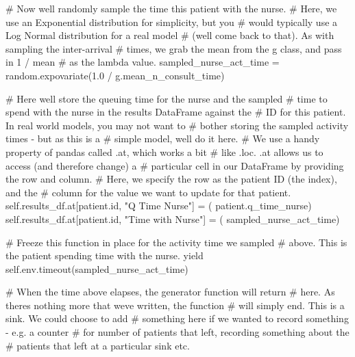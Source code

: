\documentclass[
  letterpaper,
  DIV=11,
  numbers=noendperiod]{scrreprt}
\newenvironment{Shaded}{}{}
\newcommand{\BuiltInTok}[1]{\textcolor[rgb]{0.84,0.23,0.29}{#1}}
\newcommand{\CommentTok}[1]{\textcolor[rgb]{0.42,0.45,0.49}{#1}}
\newcommand{\ControlFlowTok}[1]{\textcolor[rgb]{0.84,0.23,0.29}{#1}}
\newcommand{\FloatTok}[1]{\textcolor[rgb]{0.00,0.36,0.77}{#1}}
\newcommand{\NormalTok}[1]{\textcolor[rgb]{0.14,0.16,0.18}{#1}}
\newcommand{\OperatorTok}[1]{\textcolor[rgb]{0.14,0.16,0.18}{#1}}
\newcommand{\StringTok}[1]{\textcolor[rgb]{0.01,0.18,0.38}{#1}}
\newcommand{\VariableTok}[1]{\textcolor[rgb]{0.89,0.38,0.04}{#1}}
\begin{document}
\begin{tcolorbox}
\begin{Shaded}
\begin{Highlighting}[]
            \CommentTok{\# Now we\textquotesingle{}ll randomly sample the time this patient with the nurse.}
            \CommentTok{\# Here, we use an Exponential distribution for simplicity, but you}
            \CommentTok{\# would typically use a Log Normal distribution for a real model}
            \CommentTok{\# (we\textquotesingle{}ll come back to that).  As with sampling the inter{-}arrival}
            \CommentTok{\# times, we grab the mean from the g class, and pass in 1 / mean}
            \CommentTok{\# as the lambda value.}
\NormalTok{            sampled\_nurse\_act\_time }\OperatorTok{=}\NormalTok{ random.expovariate(}\FloatTok{1.0} \OperatorTok{/}
\NormalTok{                                                        g.mean\_n\_consult\_time)}

            \CommentTok{\# Here we\textquotesingle{}ll store the queuing time for the nurse and the sampled}
            \CommentTok{\# time to spend with the nurse in the results DataFrame against the}
            \CommentTok{\# ID for this patient.  In real world models, you may not want to}
            \CommentTok{\# bother storing the sampled activity times {-} but as this is a}
            \CommentTok{\# simple model, we\textquotesingle{}ll do it here.}
            \CommentTok{\# We use a handy property of pandas called .at, which works a bit}
            \CommentTok{\# like .loc.  .at allows us to access (and therefore change) a}
            \CommentTok{\# particular cell in our DataFrame by providing the row and column.}
            \CommentTok{\# Here, we specify the row as the patient ID (the index), and the}
            \CommentTok{\# column for the value we want to update for that patient.}
            \VariableTok{self}\NormalTok{.results\_df.at[patient.}\BuiltInTok{id}\NormalTok{, }\StringTok{"Q Time Nurse"}\NormalTok{] }\OperatorTok{=}\NormalTok{ (}
\NormalTok{                patient.q\_time\_nurse)}
            \VariableTok{self}\NormalTok{.results\_df.at[patient.}\BuiltInTok{id}\NormalTok{, }\StringTok{"Time with Nurse"}\NormalTok{] }\OperatorTok{=}\NormalTok{ (}
\NormalTok{                sampled\_nurse\_act\_time)}

            \CommentTok{\# Freeze this function in place for the activity time we sampled}
            \CommentTok{\# above.  This is the patient spending time with the nurse.}
            \ControlFlowTok{yield} \VariableTok{self}\NormalTok{.env.timeout(sampled\_nurse\_act\_time)}

            \CommentTok{\# When the time above elapses, the generator function will return}
            \CommentTok{\# here.  As there\textquotesingle{}s nothing more that we\textquotesingle{}ve written, the function}
            \CommentTok{\# will simply end.  This is a sink.  We could choose to add}
            \CommentTok{\# something here if we wanted to record something {-} e.g. a counter}
            \CommentTok{\# for number of patients that left, recording something about the}
            \CommentTok{\# patients that left at a particular sink etc.}


\end{Highlighting}
\end{Shaded}
\end{tcolorbox}
\end{document}
